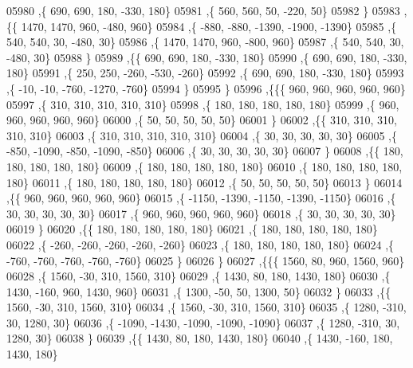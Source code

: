 \begin{DoxyCode}
05980     ,\{   690,   690,   180,  -330,   180\}
05981     ,\{   560,   560,    50,  -220,    50\}
05982     \}
05983    ,\{\{  1470,  1470,   960,  -480,   960\}
05984     ,\{  -880,  -880, -1390, -1900, -1390\}
05985     ,\{   540,   540,    30,  -480,    30\}
05986     ,\{  1470,  1470,   960,  -800,   960\}
05987     ,\{   540,   540,    30,  -480,    30\}
05988     \}
05989    ,\{\{   690,   690,   180,  -330,   180\}
05990     ,\{   690,   690,   180,  -330,   180\}
05991     ,\{   250,   250,  -260,  -530,  -260\}
05992     ,\{   690,   690,   180,  -330,   180\}
05993     ,\{   -10,   -10,  -760, -1270,  -760\}
05994     \}
05995    \}
05996   ,\{\{\{   960,   960,   960,   960,   960\}
05997     ,\{   310,   310,   310,   310,   310\}
05998     ,\{   180,   180,   180,   180,   180\}
05999     ,\{   960,   960,   960,   960,   960\}
06000     ,\{    50,    50,    50,    50,    50\}
06001     \}
06002    ,\{\{   310,   310,   310,   310,   310\}
06003     ,\{   310,   310,   310,   310,   310\}
06004     ,\{    30,    30,    30,    30,    30\}
06005     ,\{  -850, -1090,  -850, -1090,  -850\}
06006     ,\{    30,    30,    30,    30,    30\}
06007     \}
06008    ,\{\{   180,   180,   180,   180,   180\}
06009     ,\{   180,   180,   180,   180,   180\}
06010     ,\{   180,   180,   180,   180,   180\}
06011     ,\{   180,   180,   180,   180,   180\}
06012     ,\{    50,    50,    50,    50,    50\}
06013     \}
06014    ,\{\{   960,   960,   960,   960,   960\}
06015     ,\{ -1150, -1390, -1150, -1390, -1150\}
06016     ,\{    30,    30,    30,    30,    30\}
06017     ,\{   960,   960,   960,   960,   960\}
06018     ,\{    30,    30,    30,    30,    30\}
06019     \}
06020    ,\{\{   180,   180,   180,   180,   180\}
06021     ,\{   180,   180,   180,   180,   180\}
06022     ,\{  -260,  -260,  -260,  -260,  -260\}
06023     ,\{   180,   180,   180,   180,   180\}
06024     ,\{  -760,  -760,  -760,  -760,  -760\}
06025     \}
06026    \}
06027   ,\{\{\{  1560,    80,   960,  1560,   960\}
06028     ,\{  1560,   -30,   310,  1560,   310\}
06029     ,\{  1430,    80,   180,  1430,   180\}
06030     ,\{  1430,  -160,   960,  1430,   960\}
06031     ,\{  1300,   -50,    50,  1300,    50\}
06032     \}
06033    ,\{\{  1560,   -30,   310,  1560,   310\}
06034     ,\{  1560,   -30,   310,  1560,   310\}
06035     ,\{  1280,  -310,    30,  1280,    30\}
06036     ,\{ -1090, -1430, -1090, -1090, -1090\}
06037     ,\{  1280,  -310,    30,  1280,    30\}
06038     \}
06039    ,\{\{  1430,    80,   180,  1430,   180\}
06040     ,\{  1430,  -160,   180,  1430,   180\}

\end{DoxyCode}
